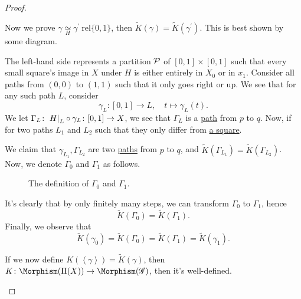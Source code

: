 \begin{proof}
\begin{itemize}
		      Now we prove \(\gamma \underset{H}{\simeq }\gamma ^\prime \  \mathrm{rel} \{0, 1\}\), then \(\widetilde{K} (\gamma ) = \widetilde{K} (\gamma ^\prime )\).
		      This is best shown by some diagram.
		      \begin{figure}[H]
			      \centering
			      \label{fig:pf:thm:Seifert-Van-Kampen-Theorem-on-groupoid-2}
		      \end{figure}
		      The left-hand side represents a partition \(\mathcal{\MakeUppercase{p}} \) of \([0, 1]\times [0, 1]\) such that every small square's image in \(X\) under \(H\) is either entirely in \(X_0\)
		      or in \(x_1\). Consider all paths from \((0, 0)\) to \((1, 1)\) such that it only goes right or up. We see that for any such path \(L\), consider
		      \[
			      \gamma _{L} \colon [0, 1]\to L, \quad t\mapsto \gamma _{L} (t).
		      \]
		      We let \(\Gamma _{L} \colon \left.H\right\vert_{L}^{} \circ \gamma _{L} \colon [0, 1]\to X\), we see that \(\Gamma _{L} \) is a \hyperref[def:path]{path} from \(p\) to \(q\). Now, if
		      for two paths \(L_1\) and \(L_2\) such that they only differ from \underline{a square}.
		      \begin{figure}[H]
			      \centering
			      \label{fig:pf:thm:Seifert-Van-Kampen-Theorem-on-groupoid-3}
		      \end{figure}
		      We claim that \(\gamma _{L_1}, \Gamma _{L_2}\) are two \hyperref[def:path]{paths} from \(p\) to \(q\), and \(\widetilde{K} (\Gamma _{L_1}) = \widetilde{K} (\Gamma _{L_2})\).
		      Now, we denote \(\Gamma _0\) and \(\Gamma _1\) as follows.
		      \begin{figure}[H]
			      \centering
			      \caption{The definition of \(\Gamma _0\) and \(\Gamma _1\).}
			      \label{fig:pf:thm:Seifert-Van-Kampen-Theorem-on-groupoid-4}
		      \end{figure}
		      It's clearly that by only finitely many steps, we can transform \(\Gamma _0\) to \(\Gamma _1\), hence
		      \[
			      \widetilde{K} (\Gamma _0) = \widetilde{K} (\Gamma _1).
		      \]
		      Finally, we observe that
		      \[
			      \widetilde{K} (\gamma _0) = \widetilde{K} (\Gamma _0) = \widetilde{K} (\Gamma _1) = \widetilde{K} (\gamma _1).
		      \]

		      If we now define \(K(\left< \gamma  \right> ) = \widetilde{K} (\gamma )\), then \(K\colon \Morphism (\Pi (X))\to \Morphism (\mathscr{G} )\), then it's well-defined.
	\end{itemize}


\end{proof}
